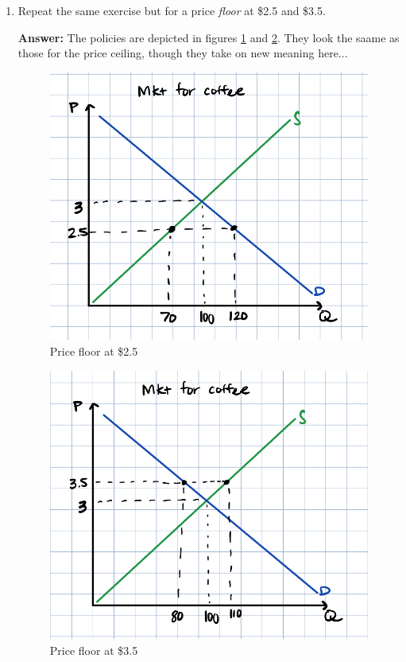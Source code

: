 \documentclass[12pt]{article}
\begin{document}
\begin{enumerate}
\vspace{2mm}

You do not have enough information to determine the new levels of price and supply, but you can tell in what direction (if any) they move. The price ceiling at \$2.5 is binding because it is below the previous equilibrium price. Since price has gone down, demand must increase, and supply must decrease. This creates a shortage, where more consumers would like to \textit{buy} coffee at \$2.5 per cup than suppliers would like to \textit{sell} coffee at that price. This is the definition of a \textit{shortage}.

\vspace{2mm}

In contrast, the price ceiling at \$3.5 is not binding because it was above the equilibrium. No suppliers were selling above \$3 before, and so no one is effected by the ceiling.



\item Repeat the same exercise but for a price \textit{floor} at \$2.5 and \$3.5.

\textbf{Answer:}
The policies are depicted in figures \ref{fig:coffee_floor_250} and \ref{fig:coffee_floor_350}. They look the saame as those for the price ceiling, though they take on new meaning here...

\begin{figure}
    \centering
    \includegraphics[width=.6\textwidth]{coffee_ceiling_250.png}
    \caption{Price floor at \$2.5}
    \label{fig:coffee_floor_250}
\end{figure}

\begin{figure}
    \centering
    \includegraphics[width=.6\textwidth]{coffee_ceiling_350.png}
    \caption{Price floor at \$3.5}
    \label{fig:coffee_floor_350}
\end{figure}


\end{enumerate}
\end{document}
